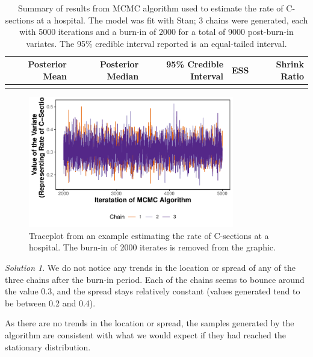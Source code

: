 \documentclass[
  letterpaper,
  DIV=11,
  numbers=noendperiod]{scrreprt}
\theoremstyle{definition}
\theoremstyle{plain}
\theoremstyle{definition}
\theoremstyle{remark}
\newtheorem*{solution}{Solution}
\begin{document}
\hypertarget{tbl-csec-mcmc}{}
\begin{table}
\caption{\label{tbl-csec-mcmc}Summary of results from MCMC algorithm used to estimate the rate of
C-sections at a hospital. The model was fit with Stan; 3 chains were
generated, each with 5000 iterations and a burn-in of 2000 for a total
of 9000 post-burn-in variates. The 95\% credible interval reported is an
equal-tailed interval. }\tabularnewline

\centering
\begin{tabular}[t]{rrrrr}
\toprule
Posterior Mean & Posterior Median & 95\% Credible Interval & ESS & Shrink Ratio\\
\midrule
\cellcolor{gray!6}{0.307} & \cellcolor{gray!6}{0.306} & \cellcolor{gray!6}{(0.224, 0.397)} & \cellcolor{gray!6}{3495.544} & \cellcolor{gray!6}{1.001}\\
\bottomrule
\end{tabular}
\end{table}

\begin{figure}

{\centering \includegraphics[width=0.8\textwidth,height=\textheight]{./images/fig-csec-traceplot-1.pdf}

}

\caption{\label{fig-csec-traceplot}Traceplot from an example estimating
the rate of C-sections at a hospital. The burn-in of 2000 iterates is
removed from the graphic.}

\end{figure}

\begin{solution}

We do not notice any trends in the location or spread of any of the
three chains after the burn-in period. Each of the chains seems to
bounce around the value 0.3, and the spread stays relatively constant
(values generated tend to be between 0.2 and 0.4).

As there are no trends in the location or spread, the samples generated
by the algorithm are consistent with what we would expect if they had
reached the stationary distribution.

\end{solution}
\end{document}
